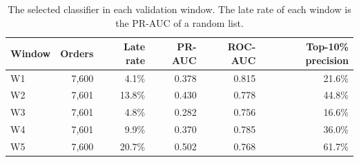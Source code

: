 \begin{table}[H]
\centering\small
\caption{The selected classifier in each validation window. The late rate of each window is the PR-AUC of a random list.}
\label{tab:classifier-windows}
\begin{tabular}{@{}lrrrrr@{}}
\toprule
Window & Orders & Late rate & PR-AUC & ROC-AUC & Top-10\% precision \\
\midrule
W1 & 7,600 & 4.1\% & 0.378 & 0.815 & 21.6\% \\
W2 & 7,601 & 13.8\% & 0.430 & 0.778 & 44.8\% \\
W3 & 7,601 & 4.8\% & 0.282 & 0.756 & 16.6\% \\
W4 & 7,601 & 9.9\% & 0.370 & 0.785 & 36.0\% \\
W5 & 7,600 & 20.7\% & 0.502 & 0.768 & 61.7\% \\
\bottomrule
\end{tabular}
\end{table}
